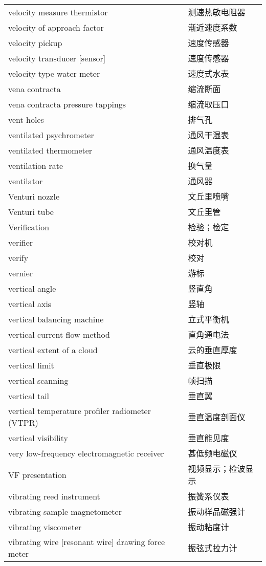 \documentclass[
]{article}
\begin{document}
\begin{longtable}[]{@{}ll@{}}
velocity measure thermistor & 测速热敏电阻器 \\
velocity of approach factor & 渐近速度系数 \\
velocity pickup & 速度传感器 \\
velocity transducer {[}sensor{]} & 速度传感器 \\
velocity type water meter & 速度式水表 \\
vena contracta & 缩流断面 \\
vena contracta pressure tappings & 缩流取压口 \\
vent holes & 排气孔 \\
ventilated psychrometer & 通风干湿表 \\
ventilated thermometer & 通风温度表 \\
ventilation rate & 换气量 \\
ventilator & 通风器 \\
Venturi nozzle & 文丘里喷嘴 \\
Venturi tube & 文丘里管 \\
Verification & 检验；检定 \\
verifier & 校对机 \\
verify & 校对 \\
vernier & 游标 \\
vertical angle & 竖直角 \\
vertical axis & 竖轴 \\
vertical balancing machine & 立式平衡机 \\
vertical current flow method & 直角通电法 \\
vertical extent of a cloud & 云的垂直厚度 \\
vertical limit & 垂直极限 \\
vertical scanning & 帧扫描 \\
vertical tail & 垂直翼 \\
vertical temperature profiler radiometer (VTPR) & 垂直温度剖面仪 \\
vertical visibility & 垂直能见度 \\
very low-frequency electromagnetic receiver & 甚低频电磁仪 \\
VF presentation & 视频显示；检波显示 \\
vibrating reed instrument & 振簧系仪表 \\
vibrating sample magnetometer & 振动样品磁强计 \\
vibrating viscometer & 振动粘度计 \\
vibrating wire {[}resonant wire{]} drawing force meter & 振弦式拉力计 \\

\end{longtable}
\end{document}
